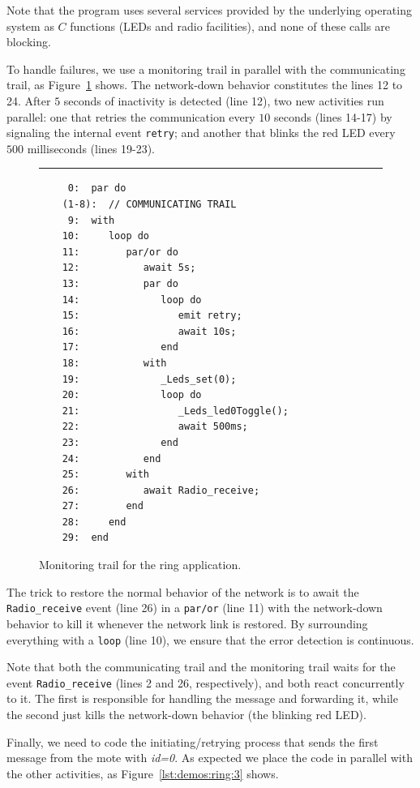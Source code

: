 \documentclass[11pt,a4paper]{article}
\newcommand{\2}{\;\;}
\newcommand{\5}{\;\;\;\;\;}
\newcommand{\code}[1] {{\small{\texttt{#1}}}}
\begin{document}
Note that the program uses several services provided by the underlying 
operating system as $C$ functions (LEDs and radio facilities), and none of 
these calls are blocking.

To handle failures, we use a monitoring trail in parallel with the 
communicating trail, as Figure~\ref{lst:demos:ring:2} shows.
The network-down behavior constitutes the lines 12 to 24.
After $5$ seconds of inactivity is detected (line 12), two new activities run 
parallel: one that retries the communication every $10$ seconds (lines 14-17) 
by signaling the internal event \code{retry}; and another that blinks the red 
LED every $500$ milliseconds (lines 19-23).

\begin{figure}[h]
\rule{15cm}{0.37pt}
{\small
\begin{verbatim}
     0:  par do
    (1-8):  // COMMUNICATING TRAIL
     9:  with
    10:     loop do
    11:        par/or do
    12:           await 5s;
    13:           par do
    14:              loop do
    15:                 emit retry;
    16:                 await 10s;
    17:              end
    18:           with
    19:              _Leds_set(0);
    20:              loop do
    21:                 _Leds_led0Toggle();
    22:                 await 500ms;
    23:              end
    24:           end
    25:        with
    26:           await Radio_receive;
    27:        end
    28:     end
    29:  end
\end{verbatim}
}
\caption{ Monitoring trail for the ring application.
\label{lst:demos:ring:2}
}
\end{figure}

The trick to restore the normal behavior of the network is to await the 
\code{Radio\_receive} event (line 26) in a \code{par/or} (line 11) with the 
network-down behavior to kill it whenever the network link is restored.
By surrounding everything with a \code{loop} (line 10), we ensure that the 
error detection is continuous.

Note that both the communicating trail and the monitoring trail waits for the 
event \code{Radio\_receive} (lines 2 and 26, respectively), and both react 
concurrently to it.
The first is responsible for handling the message and forwarding it, while the 
second just kills the network-down behavior (the blinking red LED).

Finally, we need to code the initiating/retrying process that sends the first 
message from the mote with \emph{id=0}.
As expected we place the code in parallel with the other activities, as 
Figure~\ref{lst:demos:ring:3} shows.
\end{document}
